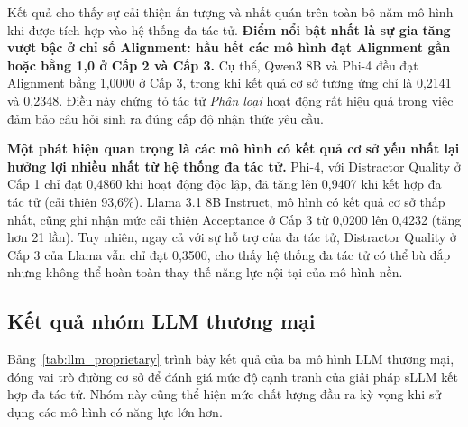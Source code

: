 Kết quả cho thấy sự cải thiện ấn tượng và nhất quán trên toàn bộ năm mô hình khi được tích hợp vào hệ thống đa tác tử. \textbf{Điểm nổi bật nhất là sự gia tăng vượt bậc ở chỉ số Alignment: hầu hết các mô hình đạt Alignment gần hoặc bằng 1,0 ở Cấp 2 và Cấp 3.} Cụ thể, Qwen3 8B và Phi-4 đều đạt Alignment bằng 1,0000 ở Cấp 3, trong khi kết quả cơ sở tương ứng chỉ là 0,2141 và 0,2348. Điều này chứng tỏ tác tử \textit{Phân loại} hoạt động rất hiệu quả trong việc đảm bảo câu hỏi sinh ra đúng cấp độ nhận thức yêu cầu.

\textbf{Một phát hiện quan trọng là các mô hình có kết quả cơ sở yếu nhất lại hưởng lợi nhiều nhất từ hệ thống đa tác tử.} Phi-4, với Distractor Quality ở Cấp 1 chỉ đạt 0,4860 khi hoạt động độc lập, đã tăng lên 0,9407 khi kết hợp đa tác tử (cải thiện 93,6\%). Llama 3.1 8B Instruct, mô hình có kết quả cơ sở thấp nhất, cũng ghi nhận mức cải thiện Acceptance ở Cấp 3 từ 0,0200 lên 0,4232 (tăng hơn 21 lần). Tuy nhiên, ngay cả với sự hỗ trợ của đa tác tử, Distractor Quality ở Cấp 3 của Llama vẫn chỉ đạt 0,3500, cho thấy hệ thống đa tác tử có thể bù đắp nhưng không thể hoàn toàn thay thế năng lực nội tại của mô hình nền.

\subsection{Kết quả nhóm LLM thương mại}

Bảng~\ref{tab:llm_proprietary} trình bày kết quả của ba mô hình LLM thương mại, đóng vai trò đường cơ sở để đánh giá mức độ cạnh tranh của giải pháp sLLM kết hợp đa tác tử. Nhóm này cũng thể hiện mức chất lượng đầu ra kỳ vọng khi sử dụng các mô hình có năng lực lớn hơn.

\begin{table}[htbp]
\centering
\caption{Kết quả đánh giá nhóm LLM thương mại trên bộ dữ liệu RACE-High}
\label{tab:llm_proprietary}
\end{table}

